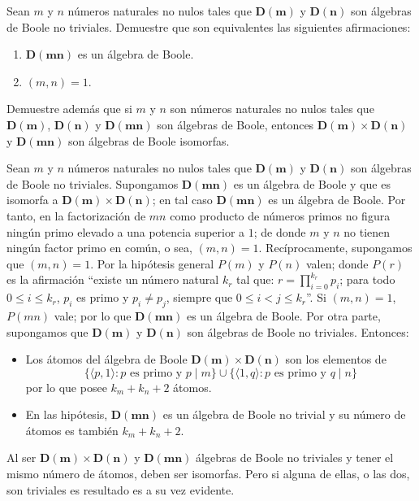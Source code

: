 \begin{exercise}
Sean $m$ y $n$ números naturales no nulos tales que
  $\mathbf{D(m)}$ y $\mathbf{D(n)}$ son álgebras de Boole no
  triviales. Demuestre que son equivalentes las siguientes
  afirmaciones:
  \begin{enumerate}
  \item $\mathbf{D(mn)}$ es un álgebra de Boole.
  \item $(m,n)=1$.
  \end{enumerate}
  Demuestre además que si $m$ y $n$ son números naturales no nulos
  tales que $\mathbf{D(m)}$, $\mathbf{D(n)}$ y $\mathbf{D(mn)}$ son
  álgebras de Boole, entonces $\mathbf{D(m)}\times\mathbf{D(n)}$ y
  $\mathbf{D(mn)}$ son álgebras de Boole isomorfas.
\end{exercise}

\begin{solution}
  Sean $m$ y $n$ números naturales no nulos tales que $\mathbf{D(m)}$
  y $\mathbf{D(n)}$ son álgebras de Boole no triviales. Supongamos
  $\mathbf{D(mn)}$ es un álgebra de Boole y que es isomorfa a
  $\mathbf{D(m)}\times\mathbf{D(n)}$; en tal caso $\mathbf{D(mn)}$ es
  un álgebra de Boole. Por tanto, en la factorización de $mn$ como
  producto de números primos no figura ningún primo elevado a una
  potencia superior a $1$; de donde $m$ y $n$ no tienen ningún factor
  primo en común, o sea, $(m,n)=1$. Recíprocamente, supongamos que
  $(m,n)=1$. Por la hipótesis general $P(m)$ y $P(n)$ valen; donde
  $P(r)$ es la afirmación ``existe un número natural $k_{r}$ tal que:
  $r=\prod_{i=0}^{k_{r}}p_{i}$; para todo $0\leq i\leq k_{r}$, $p_{i}$
  es primo y $p_{i}\neq p_{j}$, siempre que $0\leq i<j\leq
  k_{r}$''. Si $(m,n)=1$, $P(mn)$ vale; por lo que $\mathbf{D(mn)}$ es
  un álgebra de Boole. Por otra parte, supongamos que $\mathbf{D(m)}$
  y $\mathbf{D(n)}$ son álgebras de Boole no triviales. Entonces:
  \begin{itemize}
  \item Los átomos del álgebra de Boole
    $\mathbf{D(m)}\times\mathbf{D(n)}$ son los elementos de
    \begin{equation*}
      \{\langle p,1\rangle\colon p\text{ es primo y }p\mid m\}
      \cup
      \{\langle 1,q\rangle\colon p\text{ es primo y }q\mid n\}
    \end{equation*}
    por lo que posee $k_{m}+k_{n}+2$ átomos.
  \item En las hipótesis, $\mathbf{D(mn)}$ es un álgebra de Boole no
    trivial y su número de átomos es también $k_{m}+k_{n}+2$.
  \end{itemize}
  Al ser $\mathbf{D(m)}\times\mathbf{D(n)}$ y $\mathbf{D(mn)}$
  álgebras de Boole no triviales y tener el mismo número de átomos,
  deben ser isomorfas. Pero si alguna de ellas, o las dos, son
  triviales es resultado es a su vez evidente.
\end{solution}

